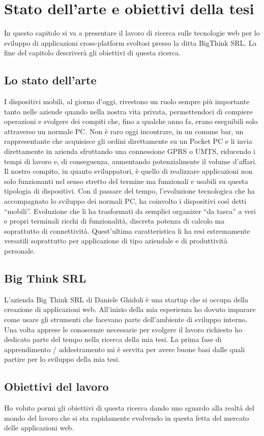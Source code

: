 \chapter{Stato dell'arte e obiettivi della tesi}
In questo capitolo si va a presentare il lavoro di ricerca sulle tecnologie web per lo sviluppo di applicazioni cross-platform svoltosi presso la ditta BigThink SRL. La fine del capitolo descriverà gli obiettivi di questa ricerca.
\section{Lo stato dell'arte}
I dispositivi mobili, al giorno d’oggi, rivestono un ruolo sempre più importante tanto nelle aziende quando nella nostra vita privata, permettendoci di compiere operazioni e svolgere dei compiti che, fino a qualche anno fa, erano eseguibili solo attraverso un normale PC.
Non è raro oggi incontrare, in un comune bar, un rappresentante che acquisisce gli ordini direttamente su un Pocket PC e li invia direttamente in azienda sfruttando una connessione GPRS o UMTS, riducendo i tempi di lavoro e, di conseguenza, aumentando potenzialmente il volume d’affari.
Il nostro compito, in quanto sviluppatori, è quello di realizzare applicazioni non solo funzionanti nel senso stretto del termine ma funzionali e usabili su questa tipologia di dispositivi.
Con il passare del tempo, l’evoluzione tecnologica che ha accompagnato lo sviluppo dei normali PC, ha coinvolto i dispositivi così detti “mobili”. Evoluzione che li ha trasformati da semplici organizer “da tasca” a veri e propri terminali ricchi di funzionalità, discreta potenza di calcolo ma soprattutto di connettività. Quest’ultima caratteristica li ha resi estremamente versatili soprattutto per applicazione di tipo aziendale e di produttività personale.

\section{Big Think SRL}
L'azienda Big Think SRL di Daniele Ghidoli è una startup che si occupa della creazione di applicazioni web. All'inizio della mia esperienza ho dovuto imparare come usare gli strumenti che facevano parte dell'ambiente di sviluppo interno. Una volta apprese le conoscenze necessarie per svolgere il lavoro richiesto ho dedicato parte del tempo nella ricerca della mia tesi. La prima fase di apprendimento / addestramento mi è servita per avere buone basi dalle quali partire per lo sviluppo della mia tesi.
\section{Obiettivi del lavoro}
Ho voluto pormi gli obiettivi di questa ricerca dando uno sguardo alla realtà del mondo del lavoro che si sta rapidamente evolvendo in questa fetta del mercato delle applicazioni web.

